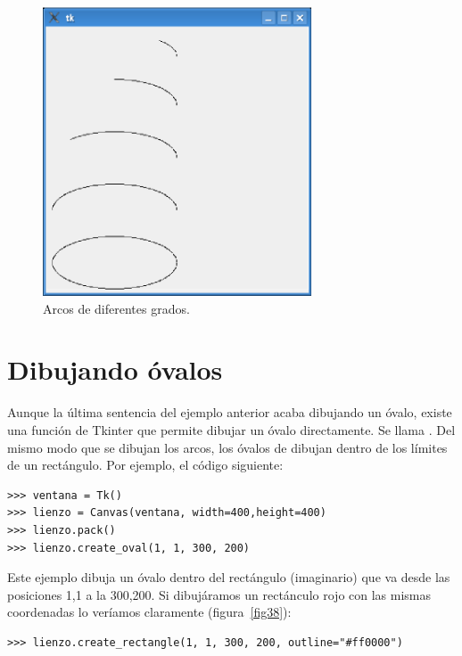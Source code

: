 \begin{figure}
\begin{center}
\includegraphics[width=80mm]{figure37.eps}
\end{center}
\caption{Arcos de diferentes grados.}\label{fig37}
\end{figure}

\section{Dibujando óvalos}

Aunque la última sentencia del ejemplo anterior acaba dibujando un óvalo, existe una función de Tkinter que permite dibujar un óvalo directamente. Se llama  .  Del mismo modo que se dibujan los arcos, los óvalos de dibujan dentro de los límites de un rectángulo.  Por ejemplo, el código siguiente:

\begin{listing}
\begin{verbatim}
>>> ventana = Tk()
>>> lienzo = Canvas(ventana, width=400,height=400)
>>> lienzo.pack()
>>> lienzo.create_oval(1, 1, 300, 200)
\end{verbatim}
\end{listing}

Este ejemplo dibuja un óvalo dentro del rectángulo (imaginario) que va desde las posiciones 1,1 a la 300,200.  Si dibujáramos un rectánculo rojo con las mismas coordenadas lo veríamos claramente (figura~\ref{fig38}):

\begin{listing}
\begin{verbatim}
>>> lienzo.create_rectangle(1, 1, 300, 200, outline="#ff0000")
\end{verbatim}
\end{listing}

